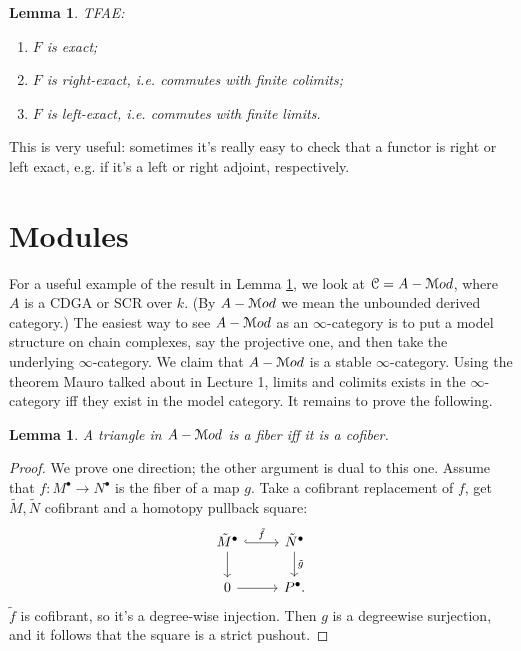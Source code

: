 \documentclass[10pt,a4paper,reqno,oneside]{book} %
\theoremstyle{plain}
\newtheorem{lem}[thm]{Lemma}
\theoremstyle{definition}
\theoremstyle{remark}
\numberwithin{equation}{section}
\begin{document}
\begin{lem}
\label{lem:exact}
TFAE:
\begin{enumerate}
\item $F$ is exact;
\item $F$ is right-exact, i.e. commutes with finite colimits;
\item $F$ is left-exact, i.e. commutes with finite limits.
\end{enumerate}
\end{lem}

This is very useful: sometimes it's really easy to check that a functor is right or left exact, e.g. if it's a left or right
adjoint, respectively.


\section{Modules}
\label{sect:modules}

For a useful example of the result in Lemma \ref{lem:exact}, we look at $\mathcal C = A-\mathcal M od$, where $A$ is a CDGA or SCR over $k$.
(By $A-\mathcal M od$ we mean the unbounded derived category.) The easiest way
to see $A-\mathcal M od$ as an $\infty$-category is to put a model structure on chain complexes, say the projective one, and then
take the underlying $\infty$-category.
We claim that $A-\mathcal M od$ is a stable $\infty$-category. Using the theorem
Mauro talked about in Lecture 1, limits and colimits exists in the $\infty$-category iff they exist in the model category.
 It remains to prove the following.

\begin{lem}
A triangle in $A-\mathcal M od$ is a fiber iff it is a cofiber.
\end{lem}
\begin{proof}
We prove one direction; the other argument is dual to this one. Assume that $f:M^{\bullet} \to N^{\bullet}$ 
is the fiber of a map $g$. Take a cofibrant replacement of $f$, get $\tilde M, \tilde N$ cofibrant and a homotopy
pullback square:
\[
\begin{tikzcd}
\tilde M^{\bullet}\arrow[hook]{r}{\tilde f}\arrow{d} & \tilde N^{\bullet}\arrow{d}{\tilde g} \\
0\arrow{r}  & P^{\bullet} .
\end{tikzcd}
\]
$\tilde f$ is cofibrant, so it's a degree-wise injection. Then $g$ is a degreewise surjection, and it follows that the 
square is a strict pushout. 
\end{proof}
\end{document}
